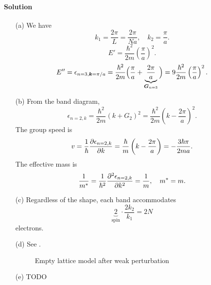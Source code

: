 \documentclass[hyperref, a4paper]{article}
\begin{document}
\paragraph{Solution} \begin{itemize}
\item[(a)] We have 
\begin{equation}
    k_1 = \frac{2\pi}{L} = \frac{2\pi}{Na}, \quad 
    k_2 = \frac{\pi}{a}.
\end{equation}
\begin{equation}
    E' = \frac{\hbar^2}{2m} \left(\frac{\pi}{a}\right)^2.
\end{equation}
\begin{equation}
    E'' = \epsilon_{n = 3, \vb*{k} = \pi / a} = \frac{\hbar^2}{2m} \Big( 
        \frac{\pi}{a} + \underbrace{\frac{2\pi}{a}}_{\vb*{G}_{n = 3}} \Big)
        = 9 \frac{\hbar^2}{2m} \left(\frac{\pi}{a}\right)^2.
\end{equation}

\item[(b)] From the band diagram, 
\begin{equation}
    \epsilon_{n = 2, k} = \frac{\hbar^2}{2m} (k + G_2)^2 
    = \frac{\hbar^2}{2m} \left( k - \frac{2\pi}{a} \right)^2.
\end{equation}
The group speed is 
\begin{equation}
    v = \frac{1}{\hbar} \pdv{\epsilon_{n = 2, k}}{k} = \frac{\hbar}{m} \left( k - \frac{2\pi}{a} \right)
    = - \frac{3 \hbar \pi}{2 m a}.
\end{equation}
The effective mass is 
\begin{equation}
    \frac{1}{m^*} = \frac{1}{\hbar^2} \pdv[2]{\epsilon_{n = 2, k}}{k}
    = \frac{1}{m}, \quad m^* = m.
\end{equation}

\item[(c)] Regardless of the shape,
each band accommodates 
\begin{equation}
    \underbrace{2}_{\text{spin}} \cdot \frac{2 k_2}{k_1} = 2N
\end{equation}
electrons.

\item[(d)] See .

\begin{figure}
    \centering
    
    \caption{Empty lattice model after weak perturbation}
    \label{fig:weak-perturbation}
\end{figure}

\item[(e)] TODO

\end{itemize}
\end{document}
